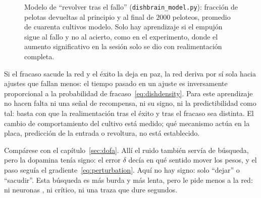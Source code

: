 \begin{figure}[t]
\centering
{}
\caption{Modelo de “revolver tras el fallo” (\texttt{dishbrain\_model.py}): fracción de pelotas devueltas al principio y al final de $2000$ peloteos, promedio de cuarenta cultivos modelo. Solo hay aprendizaje si el empujón sigue al fallo y no al acierto, como en el experimento, donde el aumento significativo en la sesión solo se dio con realimentación completa.}
\label{fig:dishmodel}
\end{figure}

\begin{keyblock}
\begin{proposition}
\label{prop:dishscramble}
Si el fracaso sacude la red y el éxito la deja en paz, la red deriva por sí sola hacia ajustes que fallan menos: el tiempo pasado en un ajuste es inversamente proporcional a la probabilidad de fracaso~\eqref{eq:dishdensity}. Para este aprendizaje no hacen falta ni una señal de recompensa, ni su signo, ni la predictibilidad como tal: basta con que la realimentación tras el éxito y tras el fracaso sea distinta. El cambio de comportamiento del cultivo está medido; qué mecanismo actúa en la placa, predicción de la entrada o revoltura, no está establecido.
\end{proposition}
\end{keyblock}

Compárese con el capítulo~\ref{sec:dofa}. Allí el ruido también servía de búsqueda, pero la dopamina tenía signo: el error $\delta$ decía en qué sentido mover los pesos, y el paso seguía el gradiente~\eqref{eq:perturbation}. Aquí no hay signo: solo “dejar” o “sacudir”. Esta búsqueda es más burda y más lenta, pero le pide menos a la red: ni neuronas , ni crítico, ni una traza que dure segundos.

